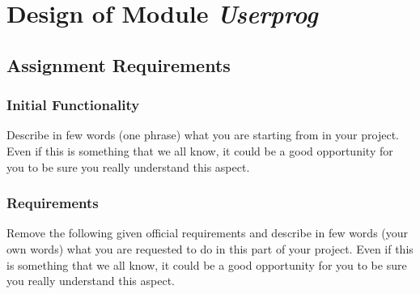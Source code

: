 
\chapter{Design of Module \textit{Userprog}}

\section{Assignment Requirements}

\subsection{Initial Functionality}

Describe in few words (one phrase) what you are starting from in your project. Even if this is something that we all know, it could be a good opportunity for you to be sure you really understand this aspect.

\subsection{Requirements}

Remove the following given official requirements and describe in few words (your own words) what you are requested to do in this part of your project. Even if this is something that we all know, it could be a good opportunity for you to be sure you really understand this aspect. 


